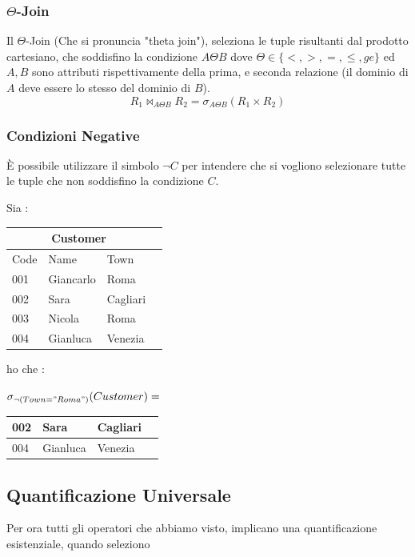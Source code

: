 \documentclass[12pt, letterpaper]{article}
\begin{document}
\subsubsection{\(\Theta\)-Join}
Il \(\Theta\)-Join (Che si pronuncia "theta join"), seleziona le tuple risultanti dal prodotto cartesiano,
che soddisfino la condizione \(A\Theta B\) dove \(\Theta\in\{<,>,=,\le,ge\}\) ed \(A,B\) sono 
attributi rispettivamente della prima, e seconda relazione (il dominio di \(A\) deve essere lo stesso
del dominio di \(B\)).\begin{equation}
    R_1\Join_{A\Theta B}R_2 = \sigma_{A\Theta B}(R_1\times R_2)
\end{equation}
\subsubsection{Condizioni Negative}
È possibile utilizzare il simbolo \(\lnot C\) per intendere che si vogliono selezionare tutte le 
tuple che non soddisfino la condizione \(C\).
\begin{center} Sia : 
    \begin{tabular}{|l|l|l|r|}
        \hline
    \multicolumn{3}{|c|}{\textbf{Customer}}\\
        \hline
        Code & Name & Town \\
        \hline
        001 & Giancarlo & Roma \\
        \hline
        002 & Sara & Cagliari \\
        \hline
        003 & Nicola & Roma \\
        \hline
        004 & Gianluca & Venezia \\
        \hline
        \end{tabular}
        ho che : \end{center}\begin{center} \(\sigma_{\lnot(Town="Roma")}(Customer)=\)
        \begin{tabular}{ |l|l|l|r| } 
            \hline 002 & Sara & Cagliari \\ 
            \hline 004 & Gianluca & Venezia \\
        \hline
           \end{tabular}
\end{center}
\newpage\subsection{Quantificazione Universale}
Per ora tutti gli operatori che abbiamo visto, implicano una quantificazione esistenziale, quando seleziono 
\end{document}
